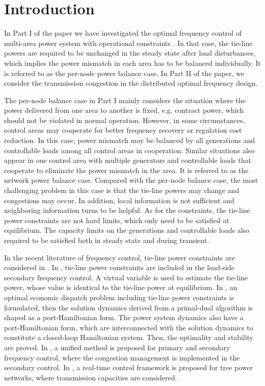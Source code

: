 \section{Introduction}
In Part I of the paper we have investigated the optimal frequency control of multi-area power system with operational constraints \cite{Wang:DistributedFrequency}. In that case, the tie-line powers are required to be unchanged in the steady state after load disturbances, which implies the power mismatch in each area has to be balanced individually. It is referred to as the per-node power balance case. In Part II of the paper, we consider the transmission congestion in the distributed optimal frequency design. 

The per-node balance case in Part I mainly considers the situation where the power delivered from one area to another is fixed, e.g. contract power, which should not be violated in normal operation. However, in some circumstances, control areas may cooperate for better frequency recovery or regulation cost reduction. In this case, power mismatch may be  balanced by all generations and controllable loads among all control areas in cooperation. Similar situations also appear in one control area with multiple generators and controllable loads that cooperate to eliminate the power mismatch in the area. It is referred to as the network power balance case. Compared with the per-node balance case, the most challenging problem in this case is that the tie-line powers may change and congestions may occur. In addition, local information is not sufficient and neighboring information turns to be helpful. As for the constraints, the tie-line power constraints are not hard limits, which only need to be satisfied at equilibrium. The capacity limits on the generations and  controllable loads also required to be satisfied both in  steady state and during transient.

In the recent  literature of frequency control, tie-line power constraints are considered in \cite{Mallada-2017-OLC-TAC, Stegink:aunifying, Stegink:aport,Yi:Distributed, zhao:aunified, zhang:real}. In \cite{Mallada-2017-OLC-TAC},  tie-line power constraints are included in the load-side secondary frequency control. A virtual variable is used to estimate the tie-line power, whose value is identical to the tie-line power at equilibrium. In \cite{Stegink:aunifying, Stegink:aport}, an optimal economic dispatch problem including  tie-line power constraints is formulated, then the solution dynamics derived from a primal-dual algorithm is shaped as a port-Hamiltonian form. The power system dynamics also have a port-Hamiltonian form, which are interconnected with the solution dynamics to constitute a closed-loop Hamiltonian system. Then, the optimality and stability are proved. In \cite{zhao:aunified}, a unified method is proposed for  primary and secondary frequency control, where the congestion management is implemented in the secondary control. In \cite{zhang:real}, a real-time control framework is proposed for tree power networks, where transmission capacities are considered. 

